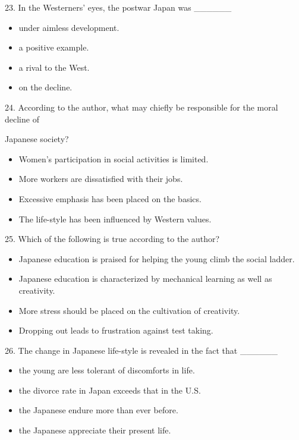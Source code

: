 \documentclass[UTF8,11pt]{ctexart}
\begin{document}
23. In the Westerners’ eyes, the postwar Japan was \_\_\_\_\_\_


\begin{itemize}[leftmargin=2em,itemsep=.2em,topsep=.4em]\item[A.] under aimless development.
\item[B.] a positive example.
\item[C.] a rival to the West.
\item[D.] on the decline.
\end{itemize}

24. According to the author, what may chiefly be responsible for the moral decline of


Japanese society?


\begin{itemize}[leftmargin=2em,itemsep=.2em,topsep=.4em]\item[A.] Women’s participation in social activities is limited.
\item[B.] More workers are dissatisfied with their jobs.
\item[C.] Excessive emphasis has been placed on the basics.
\item[D.] The life-style has been influenced by Western values.
\end{itemize}

25. Which of the following is true according to the author?


\begin{itemize}[leftmargin=2em,itemsep=.2em,topsep=.4em]\item[A.] Japanese education is praised for helping the young climb the social ladder.
\item[B.] Japanese education is characterized by mechanical learning as well as creativity.
\item[C.] More stress should be placed on the cultivation of creativity.
\item[D.] Dropping out leads to frustration against test taking.
\end{itemize}

26. The change in Japanese life-style is revealed in the fact that \_\_\_\_\_\_


\begin{itemize}[leftmargin=2em,itemsep=.2em,topsep=.4em]\item[A.] the young are less tolerant of discomforts in life.
\item[B.] the divorce rate in Japan exceeds that in the U.S.
\item[C.] the Japanese endure more than ever before.
\item[D.] the Japanese appreciate their present life.
\end{itemize}
\end{document}
